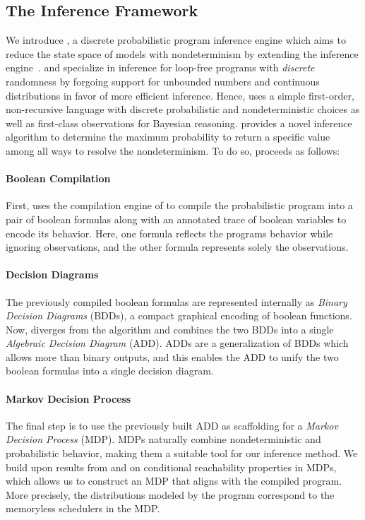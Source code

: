 \subsection{The \NDICE Inference Framework}
We introduce \NDICE, a discrete probabilistic program inference engine which aims to reduce the state space of models with nondeterminism by extending the \DICE inference engine~\cite{holtzen2020scaling}.
\DICE and \NDICE specialize in inference for loop-free programs with \textit{discrete} randomness by forgoing support for unbounded numbers and continuous distributions in favor of more efficient inference.
Hence, \NDICE uses a simple first-order, non-recursive language with discrete probabilistic and nondeterministic choices as well as first-class observations for Bayesian reasoning.
\NDICE provides a novel inference algorithm to determine the maximum probability to return a specific value among all ways to resolve the nondeterminism.
To do so, \NDICE proceeds as follows:

\paragraph{Boolean Compilation}
First, \NDICE uses the compilation engine of \DICE to compile the probabilistic program into a pair of boolean formulas along with an annotated trace of boolean variables to encode its behavior.
Here, one formula reflects the programs behavior while ignoring observations, and the other formula represents solely the observations.


\paragraph{Decision Diagrams}
The previously compiled boolean formulas are represented internally as \textit{Binary Decision Diagrams} (BDDs), a compact graphical encoding of boolean functions.
Now, \NDICE diverges from the \DICE algorithm and combines the two BDDs into a single \textit{Algebraic Decision Diagram} (ADD).
ADDs are a generalization of BDDs which allows more than binary outputs, and this enables the ADD to unify the two boolean formulas into a single decision diagram. 


\paragraph{Markov Decision Process}
The final step is to use the previously built ADD as scaffolding for a \textit{Markov Decision Process} (MDP).
MDPs naturally combine nondeterministic and probabilistic behavior, making them a suitable tool for our inference method.
We build upon results from \citet{baier2014computing} and {\citetBisection} on conditional reachability properties in MDPs, which allows us to construct an MDP that aligns with the compiled program.
More precisely, the distributions modeled by the program correspond to the memoryless schedulers in the MDP.
\medskip

